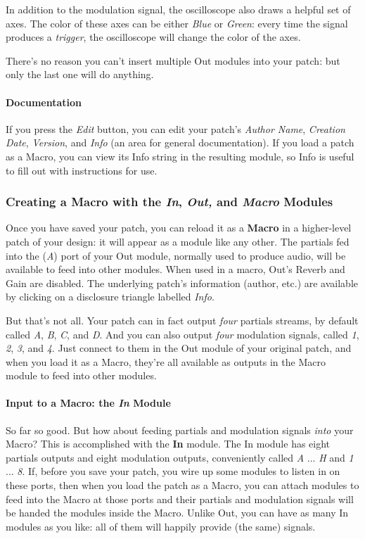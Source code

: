 \documentclass{article}
\begin{document}
In addition to the modulation signal, the oscilloscope also draws a helpful set of axes.  The color of these axes can be either {\it Blue} or {\it Green}: every time the signal produces a {\it trigger}, the oscilloscope will change the color of the axes.

There's no reason you can't insert multiple Out modules into your patch: but only the last one will do anything.

\paragraph{Documentation} If you press the {\it Edit} button, you can edit your patch's {\it Author Name}, {\it Creation Date}, {\it Version}, and {\it Info} (an area for general documentation).  If you load a patch as a Macro, you can view its Info string in the resulting module, so Info is useful to fill out with instructions for use.

\subsubsection{Creating a Macro with the \textit{In}, \textit{Out,} and \textit{Macro} Modules}
\label{creatingmacros}

Once you have saved your patch, you can reload it as a {\bf Macro} in a higher-level patch of your design: it will appear as a module like any other.  The partials fed into the ({\it A}) port of your Out module, normally used to produce audio, will be available to feed into other modules. When used in a macro, Out's Reverb and Gain are disabled.  The underlying patch's information (author, etc.) are available by clicking on a disclosure triangle labelled {\it Info}.  

But that's not all.  Your patch can in fact output {\it four} partials streams, by default called {\it A}, {\it B}, {\it C}, and {\it D}.  And you can also output {\it four} modulation signals, called {\it 1}, {\it 2}, {\it 3}, and {\it 4}.  Just connect to them in the Out module of your original patch, and when you load it as a Macro, they're all available as outputs in the Macro module to feed into other modules.


\paragraph{Input to a Macro: the \textit{In} Module}  So far so good.  But how about feeding partials and modulation signals {\it into} your Macro?  This is accomplished with the {\bf In} module.  The In module has eight partials outputs and eight modulation outputs, conveniently called {\it A} ... {\it H} and {\it 1} ... {\it 8}.  If, before you save your patch, you wire up some modules to listen in on these ports, then when you load the patch as a Macro, you can attach modules to feed into the Macro at those ports and their partials and modulation signals will be handed the modules inside the Macro.  Unlike Out, you can have as many In modules as you like: all of them will happily provide (the same) signals.
\end{document}

